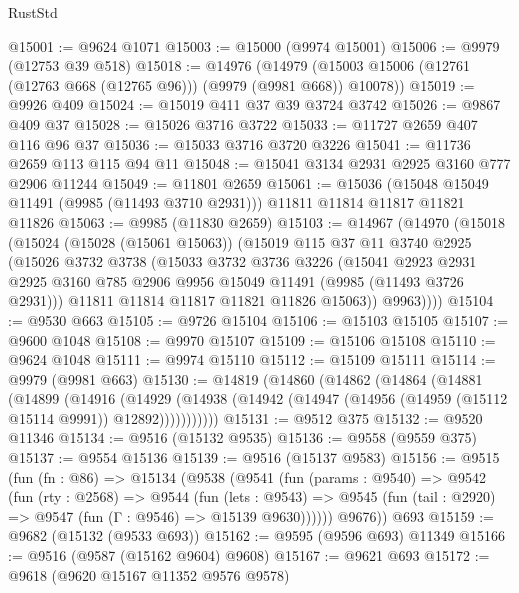 \begin{lexlean}{RustStd}
\begin{coremodule}
@15001 := @9624 @1071
@15003 := @15000 (@9974 @15001)
@15006 := @9979 (@12753 @39 @518)
@15018 := @14976
    (@14979 (@15003 @15006 (@12761 (@12763 @668 (@12765 @96))) (@9979 (@9981 @668)) @10078))
@15019 := @9926 @409
@15024 := @15019 @411 @37 @39 @3724 @3742
@15026 := @9867 @409 @37
@15028 := @15026 @3716 @3722
@15033 := @11727 @2659 @407 @116 @96 @37
@15036 := @15033 @3716 @3720 @3226
@15041 := @11736 @2659 @113 @115 @94 @11
@15048 := @15041 @3134 @2931 @2925 @3160 @777 @2906 @11244
@15049 := @11801 @2659
@15061 := @15036
    (@15048 @15049 @11491 (@9985 (@11493 @3710 @2931)))
    @11811
    @11814
    @11817
    @11821
    @11826
@15063 := @9985 (@11830 @2659)
@15103 := @14967
    (@14970
      (@15018
        (@15024
          (@15028 (@15061 @15063))
          (@15019
            @115
            @37
            @11
            @3740
            @2925
            (@15026
              @3732
              @3738
              (@15033
                @3732
                @3736
                @3226
                (@15041
                  @2923
                  @2931
                  @2925
                  @3160
                  @785
                  @2906
                  @9956
                  @15049
                  @11491
                  (@9985 (@11493 @3726 @2931)))
                @11811
                @11814
                @11817
                @11821
                @11826
                @15063))
            @9963))))
@15104 := @9530 @663
@15105 := @9726 @15104
@15106 := @15103 @15105
@15107 := @9600 @1048
@15108 := @9970 @15107
@15109 := @15106 @15108
@15110 := @9624 @1048
@15111 := @9974 @15110
@15112 := @15109 @15111
@15114 := @9979 (@9981 @663)
@15130 := @14819
    (@14860
      (@14862
        (@14864
          (@14881
            (@14899
              (@14916
                (@14929
                  (@14938 (@14942 (@14947 (@14956 (@14959 (@15112 @15114 @9991)) @12892)))))))))))
@15131 := @9512 @375
@15132 := @9520 @11346
@15134 := @9516 (@15132 @9535)
@15136 := @9558 (@9559 @375)
@15137 := @9554 @15136
@15139 := @9516 (@15137 @9583)
@15156 := @9515
    (fun (fn : @86) =>
    @15134
      (@9538
        (@9541
          (fun (params : @9540) =>
          @9542
            (fun (rty : @2568) =>
            @9544
              (fun (lets : @9543) =>
              @9545 (fun (tail : @2920) => @9547 (fun (Γ : @9546) => @15139 @9630))))))
        @9676))
    @693
@15159 := @9682 (@15132 (@9533 @693))
@15162 := @9595 (@9596 @693) @11349
@15166 := @9516 (@9587 (@15162 @9604) @9608)
@15167 := @9621 @693
@15172 := @9618 (@9620 @15167 @11352 @9576 @9578)

\end{coremodule}
\end{lexlean}

